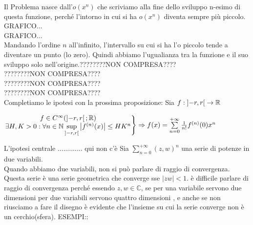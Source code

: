 Il Problema nasce dall'$o(x^n)$ che scriviamo alla fine dello sviluppo n-esimo di questa funzione, perché l'intorno in cui si ha $o(x^n)$ diventa sempre più piccolo.
GRAFICO...\\
GRAFICO...\\
Mandando l'ordine $n$ all'infinito, l'intervallo su cui si ha l'o piccolo tende a diventare un punto (lo zero). Quindi abbiamo l'ugualianza tra la funzione e il suo sviluppo solo nell'origine.????????NON COMPRESA????\\
????????NON COMPRESA????\\
????????NON COMPRESA????\\
????????NON COMPRESA????\\
Completiamo le ipotesi con la prossima proposizione:
\proposition
Sia $f:\left]-r,r\right[\to \mathbb{R}$
\begin{center}
	$\left.\begin{matrix}
	f\in C^{\infty}(\left]-r,r\right[; \mathbb{R})\\
	\exists H,K >0 :\forall n\in\mathbb{N} \sup\limits_{\left]-r,r\right[}\left|f^{(n)}(x)\right|\le HK^n\\
	\end{matrix}\right\}
	\Rightarrow f(x)=\sum\limits_{n=0}^{+\infty}\frac{1}{n!}f^{(n)}(0)x^n$
\end{center}
\observation
L'ipotesi centrale ............. qui non c'è
\observation
Sia $\sum\limits_{n=0}^{+\infty}(z,w)^n$ una serie di potenze in due variabili.\\
Quando abbiamo due variabili, non si può parlare di raggio di convergenza. Questa serie è una serie geometrica che converge sse $\left|zw\right|<1$. è  difficile parlare di raggio di convergenza  perché essendo $z,w\in\mathbb{C}$, se per una variabile servono due dimensioni per due variabili servono quattro dimensioni , e anche se non riusciamo a fare il disegno è evidente che l'insieme su cui la serie converge non è un cerchio(sfera).
ESEMPI::
